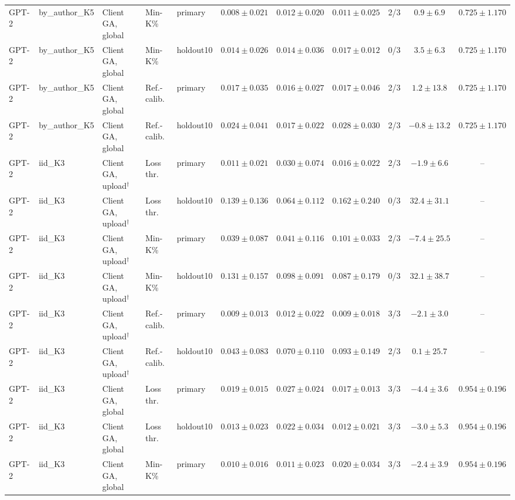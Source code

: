 \begin{table}[t]
\begin{tabular*}{\textwidth}{@{\extracolsep{\fill}}lllllcccccc@{}}
GPT-2 & by\_author\_K5 & Client GA, global & Min-K\% & primary & $0.008 \pm 0.021$ & $0.012 \pm 0.020$ & $0.011 \pm 0.025$ & 2/3 & $0.9 \pm 6.9$ & $0.725 \pm 1.170$ \\
GPT-2 & by\_author\_K5 & Client GA, global & Min-K\% & holdout10 & $0.014 \pm 0.026$ & $0.014 \pm 0.036$ & $0.017 \pm 0.012$ & 0/3 & $3.5 \pm 6.3$ & $0.725 \pm 1.170$ \\
GPT-2 & by\_author\_K5 & Client GA, global & Ref.-calib. & primary & $0.017 \pm 0.035$ & $0.016 \pm 0.027$ & $0.017 \pm 0.046$ & 2/3 & $1.2 \pm 13.8$ & $0.725 \pm 1.170$ \\
GPT-2 & by\_author\_K5 & Client GA, global & Ref.-calib. & holdout10 & $0.024 \pm 0.041$ & $0.017 \pm 0.022$ & $0.028 \pm 0.030$ & 2/3 & $-0.8 \pm 13.2$ & $0.725 \pm 1.170$ \\
GPT-2 & iid\_K3 & Client GA, upload$^{\dagger}$ & Loss thr. & primary & $0.011 \pm 0.021$ & $0.030 \pm 0.074$ & $0.016 \pm 0.022$ & 2/3 & $-1.9 \pm 6.6$ & -- \\
GPT-2 & iid\_K3 & Client GA, upload$^{\dagger}$ & Loss thr. & holdout10 & $0.139 \pm 0.136$ & $0.064 \pm 0.112$ & $0.162 \pm 0.240$ & 0/3 & $32.4 \pm 31.1$ & -- \\
GPT-2 & iid\_K3 & Client GA, upload$^{\dagger}$ & Min-K\% & primary & $0.039 \pm 0.087$ & $0.041 \pm 0.116$ & $0.101 \pm 0.033$ & 2/3 & $-7.4 \pm 25.5$ & -- \\
GPT-2 & iid\_K3 & Client GA, upload$^{\dagger}$ & Min-K\% & holdout10 & $0.131 \pm 0.157$ & $0.098 \pm 0.091$ & $0.087 \pm 0.179$ & 0/3 & $32.1 \pm 38.7$ & -- \\
GPT-2 & iid\_K3 & Client GA, upload$^{\dagger}$ & Ref.-calib. & primary & $0.009 \pm 0.013$ & $0.012 \pm 0.022$ & $0.009 \pm 0.018$ & 3/3 & $-2.1 \pm 3.0$ & -- \\
GPT-2 & iid\_K3 & Client GA, upload$^{\dagger}$ & Ref.-calib. & holdout10 & $0.043 \pm 0.083$ & $0.070 \pm 0.110$ & $0.093 \pm 0.149$ & 2/3 & $0.1 \pm 25.7$ & -- \\
GPT-2 & iid\_K3 & Client GA, global & Loss thr. & primary & $0.019 \pm 0.015$ & $0.027 \pm 0.024$ & $0.017 \pm 0.013$ & 3/3 & $-4.4 \pm 3.6$ & $0.954 \pm 0.196$ \\
GPT-2 & iid\_K3 & Client GA, global & Loss thr. & holdout10 & $0.013 \pm 0.023$ & $0.022 \pm 0.034$ & $0.012 \pm 0.021$ & 3/3 & $-3.0 \pm 5.3$ & $0.954 \pm 0.196$ \\
GPT-2 & iid\_K3 & Client GA, global & Min-K\% & primary & $0.010 \pm 0.016$ & $0.011 \pm 0.023$ & $0.020 \pm 0.034$ & 3/3 & $-2.4 \pm 3.9$ & $0.954 \pm 0.196$ \\

\end{tabular*}
\end{table}
